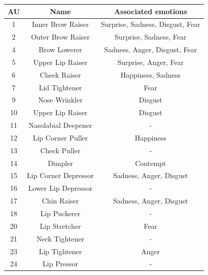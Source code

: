\begin{table}[]
\centering
\begin{tabular}{c|c|c}
\hline
\textbf{AU} & \textbf{Name}        & \textbf{Associated emotions}     \\ \hline
1           & Inner Brow Raiser    & Surprise, Sadness, Disgust, Fear \\ \hline
2           & Outer Brow Raiser    & Surprise, Sadness, Fear          \\ \hline
4           & Brow Lowerer         & Sadness, Anger, Disgust, Fear    \\ \hline
5           & Upper Lip Raiser     & Surprise, Anger, Fear            \\ \hline
6           & Cheek Raiser         & Happiness, Sadness               \\ \hline
7           & Lid Tightener        & Fear                             \\ \hline
9           & Nose Wrinkler        & Disgust                          \\ \hline
10          & Upper Lip Raiser     & Disgust                          \\ \hline
11          & Nasolabial Deepener  & -                                \\ \hline
12          & Lip Corner Puller    & Happiness                        \\ \hline
13          & Check Puller         & -                                \\ \hline
14          & Dimpler              & Contempt                         \\ \hline
15          & Lip Corner Depressor & Sadness, Anger, Disgust          \\ \hline
16          & Lower Lip Depressor  & -                                \\ \hline
17          & Chin Raiser          & Sadness, Anger, Disgust          \\ \hline
18          & Lip Puckerer         & -                                \\ \hline
20          & Lip Stretcher        & Fear                             \\ \hline
21          & Neck Tightener       & -                                \\ \hline
23          & Lip Tightener        & Anger                            \\ \hline
24          & Lip Pressor          & -                                \\ \hline

\end{tabular}
\end{table}
